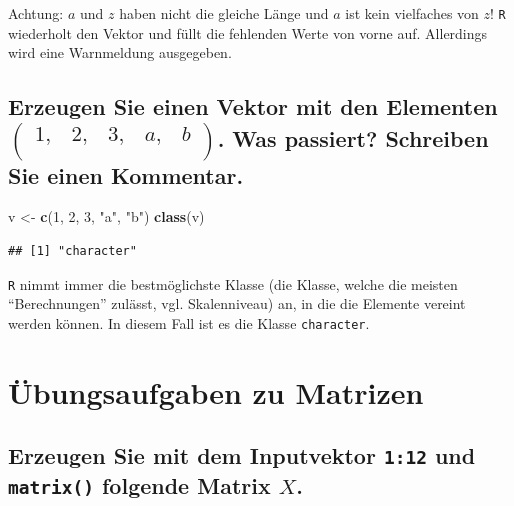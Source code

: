 \documentclass[12pt,a4paper]{article}
\newenvironment{Shaded}{\begin{snugshade}}{\end{snugshade}}
\newcommand{\DecValTok}[1]{\textcolor[rgb]{0.00,0.00,0.81}{#1}}
\newcommand{\FunctionTok}[1]{\textcolor[rgb]{0.13,0.29,0.53}{\textbf{#1}}}
\newcommand{\NormalTok}[1]{#1}
\newcommand{\OtherTok}[1]{\textcolor[rgb]{0.56,0.35,0.01}{#1}}
\newcommand{\StringTok}[1]{\textcolor[rgb]{0.31,0.60,0.02}{#1}}
\begin{document}
Achtung: \(a\) und \(z\) haben nicht die gleiche Länge und \(a\) ist
kein vielfaches von \(z\)! \texttt{R} wiederholt den Vektor und füllt
die fehlenden Werte von vorne auf. Allerdings wird eine Warnmeldung
ausgegeben.

\vspace{0.5cm}

\subsection{\texorpdfstring{Erzeugen Sie einen Vektor mit den Elementen
\(\begin{pmatrix} 1, & 2, & 3, & a, & b \\ \end{pmatrix}\). Was
passiert? Schreiben Sie einen
Kommentar.}{Erzeugen Sie einen Vektor mit den Elementen \textbackslash begin\{pmatrix\} 1, \& 2, \& 3, \& a, \& b \textbackslash\textbackslash{} \textbackslash end\{pmatrix\}. Was passiert? Schreiben Sie einen Kommentar.}}\label{erzeugen-sie-einen-vektor-mit-den-elementen-beginpmatrix-1-2-3-a-b-endpmatrix.-was-passiert-schreiben-sie-einen-kommentar.}

\begin{Shaded}
\begin{Highlighting}[]
\NormalTok{    v }\OtherTok{\textless{}{-}} \FunctionTok{c}\NormalTok{(}\DecValTok{1}\NormalTok{, }\DecValTok{2}\NormalTok{, }\DecValTok{3}\NormalTok{, }\StringTok{"a"}\NormalTok{, }\StringTok{"b"}\NormalTok{)}
    \FunctionTok{class}\NormalTok{(v)}
\end{Highlighting}
\end{Shaded}

\begin{verbatim}
## [1] "character"
\end{verbatim}

\texttt{R} nimmt immer die bestmöglichste Klasse (die Klasse, welche die
meisten ``Berechnungen'' zulässt, vgl. Skalenniveau) an, in die die
Elemente vereint werden können. In diesem Fall ist es die Klasse
\texttt{character}.

\vspace{0.5cm}

\section{Übungsaufgaben zu
Matrizen}\label{uxfcbungsaufgaben-zu-matrizen}

\subsection{\texorpdfstring{Erzeugen Sie mit dem Inputvektor
\texttt{1:12} und \texttt{matrix()} folgende Matrix
\(X\).}{Erzeugen Sie mit dem Inputvektor 1:12 und  folgende Matrix X.}}\label{erzeugen-sie-mit-dem-inputvektor-112-und-folgende-matrix-x.}
\end{document}
